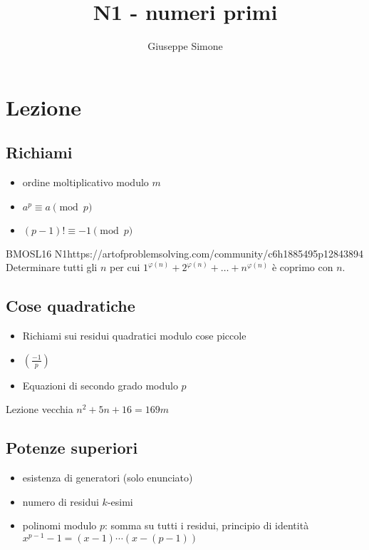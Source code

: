 \documentclass[12pt]{article}
\author{Giuseppe Simone}
\title{N1 - numeri primi}
\begin{document}
\maketitle


\section{Lezione}

\subsection{Richiami}
\begin{itemize}
    \item ordine moltiplicativo modulo $m$
    \item $a^p\equiv a\pmod p$
    \item $(p-1)!\equiv-1\pmod p$
\end{itemize}

\begin{esercizio}{BMOSL16 N1}{https://artofproblemsolving.com/community/c6h1885495p12843894}
    Determinare tutti gli $n$ per cui $1^{\varphi(n)}+2^{\varphi(n)}+\dots+n^{\varphi(n)}$ è coprimo con $n$.
\end{esercizio}

\subsection{Cose quadratiche}

\begin{itemize}
    \item Richiami sui residui quadratici modulo cose piccole
    \item $\left( \frac{-1}{p} \right)$
    \item Equazioni di secondo grado modulo $p$
\end{itemize}

\begin{esercizio}{Lezione vecchia}{}
    $n^2+5n+16=169m$
\end{esercizio}

\subsection{Potenze superiori}
\begin{itemize}
    \item esistenza di generatori (solo enunciato)
    \item numero di residui $k$-esimi
    \item polinomi modulo $p$: somma su tutti i residui, principio di identità $x^{p-1}-1=(x-1)\cdots(x-(p-1))$
\end{itemize}
\end{document}
